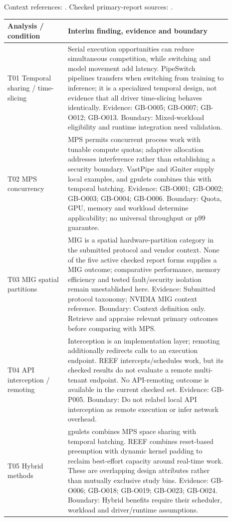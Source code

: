 \documentclass[12pt,a4paper]{article}
\begin{document}
Context references: \cite{nvidiaMPS,nvidiaMIG,nvidiaTime}. Checked primary-report sources: \cite{vastpipe,igniter,gpulets,pipeswitch,reef}. 
\begin{longtable}{p{0.24\linewidth}p{0.65\linewidth}}
\toprule
Analysis /\allowbreak{} condition & Interim finding, evidence and boundary\\\midrule
\endhead
T01 Temporal sharing /\allowbreak{} time-slicing & Serial execution opportunities can reduce simultaneous competition, while switching and model movement add latency. PipeSwitch pipelines transfers when switching from training to inference; it is a specialized temporal design, not evidence that all driver time-slicing behaves identically. Evidence: GB-O005; GB-O007; GB-O012; GB-O013. Boundary: Mixed-workload eligibility and runtime integration need validation.\\
T02 MPS concurrency & MPS permits concurrent process work with tunable compute quotas; adaptive allocation addresses interference rather than establishing a security boundary. VastPipe and iGniter supply local examples, and gpulets combines this with temporal batching. Evidence: GB-O001; GB-O002; GB-O003; GB-O004; GB-O006. Boundary: Quota, GPU, memory and workload determine applicability; no universal throughput or p99 guarantee.\\
T03 MIG spatial partitions & MIG is a spatial hardware-partition category in the submitted protocol and vendor context. None of the five active checked report forms supplies a MIG outcome; comparative performance, memory efficiency and tested fault/\allowbreak{}security isolation remain unestablished here. Evidence: Submitted protocol taxonomy; NVIDIA MIG context reference. Boundary: Context definition only. Retrieve and appraise relevant primary outcomes before comparing with MPS.\\
T04 API interception /\allowbreak{} remoting & Interception is an implementation layer; remoting additionally redirects calls to an execution endpoint. REEF intercepts/\allowbreak{}schedules work, but its checked results do not evaluate a remote multi-tenant endpoint. No API-remoting outcome is available in the current checked set. Evidence: GB-P005. Boundary: Do not relabel local API interception as remote execution or infer network overhead.\\
T05 Hybrid methods & gpulets combines MPS space sharing with temporal batching. REEF combines reset-based preemption with dynamic kernel padding to reclaim best-effort capacity around real-time work. These are overlapping design attributes rather than mutually exclusive study bins. Evidence: GB-O006; GB-O018; GB-O019; GB-O023; GB-O024. Boundary: Hybrid benefits require their scheduler, workload and driver/\allowbreak{}runtime assumptions.\\
\bottomrule
\end{longtable}
\end{document}
